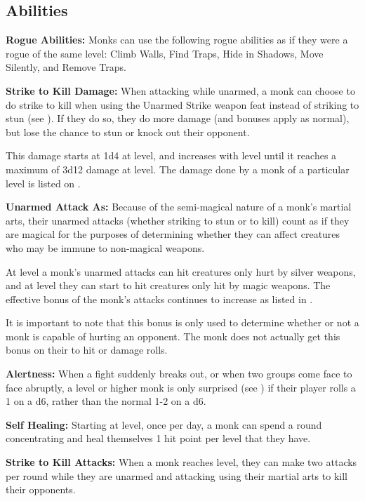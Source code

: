 \begin{multicols*}{2}
\subsection{Abilities}
\textbf{Rogue Abilities:} Monks can use the following rogue abilities as if they were a rogue of the same level: Climb Walls, Find Traps, Hide in Shadows, Move Silently, and Remove Traps.

\textbf{Strike to Kill Damage:} When attacking while unarmed, a monk can choose to do strike to kill when using the Unarmed Strike weapon feat instead of striking to stun (see ). If they do so, they do more damage (and  bonuses apply as normal), but lose the chance to stun or knock out their opponent.

This damage starts at 1d4 at  level, and increases with level until it reaches a maximum of 3d12 damage at  level. The damage done by a monk of a particular level is listed on .

\textbf{Unarmed Attack As:} Because of the semi-magical nature of a monk’s martial arts, their unarmed attacks (whether striking to stun or to kill) count as if they are magical for the purposes of determining whether they can affect creatures who may be immune to non-magical weapons.

At  level a monk’s unarmed attacks can hit creatures only hurt by silver weapons, and at  level they can start to hit creatures only hit by magic weapons. The effective bonus of the monk’s attacks continues to increase as listed in .

It is important to note that this bonus is only used to determine whether or not a monk is capable of hurting an opponent. The monk does not actually get this bonus on their to hit or damage rolls.

\textbf{Alertness:} When a fight suddenly breaks out, or when two groups come face to face abruptly, a  level or higher monk is only surprised (see ) if their player rolls a 1 on a d6, rather than the normal 1-2 on a d6.

\textbf{Self Healing:} Starting at  level, once per day, a monk can spend a round concentrating and heal themselves 1 hit point per level that they have.

\textbf{Strike to Kill Attacks:} When a monk reaches  level, they can make two attacks per round while they are unarmed and attacking using their martial arts to kill their opponents.


\end{multicols*}
